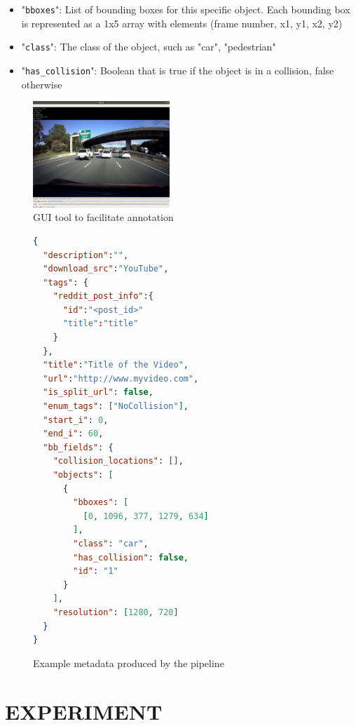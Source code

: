 \documentclass[letterpaper, 10 pt, conference]{ieeeconf}
\begin{document}
\begin{itemize}
\begin{itemize}
\begin{itemize}
      \item "\texttt{bboxes}": List of bounding boxes for this specific object. Each bounding box is represented as a 1x5 array with elements (frame number, x1, y1, x2, y2)
      \item "\texttt{class}": The class of the object, such as "car", "pedestrian"
      \item "\texttt{has\_collision}": Boolean that is true if the object is in a collision, false otherwise
    \end{itemize}
  \end{itemize}
\end{itemize}

\begin{figure}[htbp]
	\centering
	\includegraphics[width=0.46\textwidth]{example_gui_tool.png}
	\caption{GUI tool to facilitate annotation}
	\label{fig:example_gui_tool-png}
\end{figure}

\begin{figure}[htbp]
  \begin{lstlisting}[language=json,xleftmargin=5mm]
{
  "description":"",
  "download_src":"YouTube",
  "tags": {
    "reddit_post_info":{
      "id":"<post_id>"
      "title":"title"
    }
  },
  "title":"Title of the Video",
  "url":"http://www.myvideo.com",
  "is_split_url": false,
  "enum_tags": ["NoCollision"],
  "start_i": 0,
  "end_i": 60,
  "bb_fields": {
    "collision_locations": [],
    "objects": [
      {
        "bboxes": [
          [0, 1096, 377, 1279, 634]
        ],
        "class": "car",
        "has_collision": false,
        "id": "1"
      }
    ],
    "resolution": [1280, 720]
  }
}
  \end{lstlisting}
    \caption{Example metadata produced by the pipeline}
    \label{metadata_example}
\end{figure}

\section{EXPERIMENT}
\end{document}
